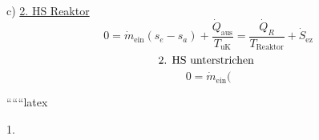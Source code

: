 c) \underline{2. HS Reaktor}
\[
0 = \dot{m}_{\text{ein}} (s_e - s_a) + \frac{\dot{Q}_{\text{aus}}}{T_{\text{uK}}} = \frac{\dot{Q}_R}{T_{\text{Reaktor}}} + \dot{S}_{\text{ez}}
\]
\[
\text{2. HS \text{unterstrichen} }
\]
\[
0 = \dot{m}_{\text{ein}} (
\]

``````latex


1.